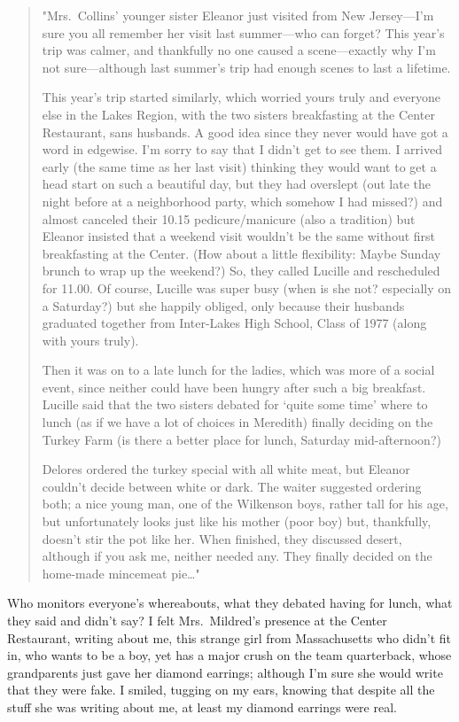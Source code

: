 \begin{quote}
"Mrs.~Collins' younger sister Eleanor just visited from New Jersey---I'm
sure you all remember her visit last summer---who can forget? This
year's trip was calmer, and thankfully no one caused a scene---exactly
why I'm not sure---although last summer's trip had enough scenes to last
a lifetime.

This year's trip started similarly, which worried yours truly and
everyone else in the Lakes Region, with the two sisters breakfasting at
the Center Restaurant, sans husbands. A good idea since they never would
have got a word in edgewise. I'm sorry to say that I didn't get to see
them. I arrived early (the same time as her last visit) thinking they
would want to get a head start on such a beautiful day, but they had
overslept (out late the night before at a neighborhood party, which
somehow I had missed?) and almost canceled their 10.15 pedicure/manicure
(also a tradition) but Eleanor insisted that a weekend visit wouldn't be
the same without first breakfasting at the Center. (How about a little
flexibility: Maybe Sunday brunch to wrap up the weekend?) So, they
called Lucille and rescheduled for 11.00. Of course, Lucille was super
busy (when is she not? especially on a Saturday?) but she happily
obliged, only because their husbands graduated together from Inter-Lakes
High School, Class of 1977 (along with yours truly).

Then it was on to a late lunch for the ladies, which was more of a
social event, since neither could have been hungry after such a big
breakfast. Lucille said that the two sisters debated for `quite some
time' where to lunch (as if we have a lot of choices in Meredith)
finally deciding on the Turkey Farm (is there a better place for lunch,
Saturday mid-afternoon?)

Delores ordered the turkey special with all white meat, but Eleanor
couldn't decide between white or dark. The waiter suggested ordering
both; a nice young man, one of the Wilkenson boys, rather tall for his
age, but unfortunately looks just like his mother (poor boy) but,
thankfully, doesn't stir the pot like her. When finished, they discussed
desert, although if you ask me, neither needed any. They finally decided
on the home-made mincemeat pie\ldots"
\end{quote}

Who monitors everyone's whereabouts, what they debated having for lunch,
what they said and didn't say? I felt Mrs.~Mildred's presence at the
Center Restaurant, writing about me, this strange girl from
Massachusetts who didn't fit in, who wants to be a boy, yet has a major
crush on the team quarterback, whose grandparents just gave her diamond
earrings; although I'm sure she would write that they were fake. I
smiled, tugging on my ears, knowing that despite all the stuff she was
writing about me, at least my diamond earrings were real.

